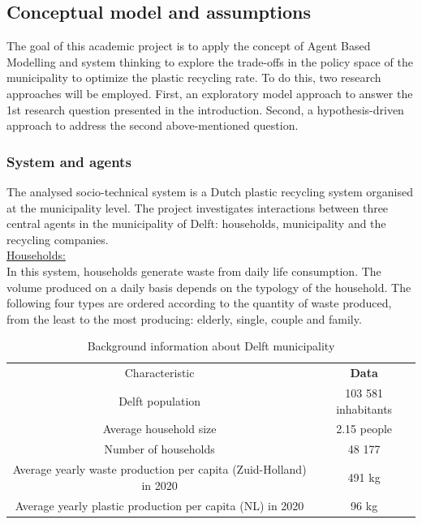 \subsection{Conceptual model and assumptions}
\noindent The goal of this academic project is to apply the concept of Agent Based Modelling and system thinking to explore the trade-offs in the policy space of the municipality to optimize the plastic recycling rate. To do this, two research approaches will be employed. First, an exploratory model approach to answer the 1st research question presented in the introduction. Second, a hypothesis-driven approach to address the second above-mentioned question. 

\subsubsection{System and agents}
\noindent The analysed socio-technical system is a Dutch plastic recycling system organised at the municipality level. The project investigates interactions between three central agents in the municipality of Delft: households, municipality and the recycling companies. \\

\underline{Households:}\\
\noindent In this system, households generate waste from daily life consumption. The volume produced on a daily basis depends on the typology of the household. The following four types are ordered according to the quantity of waste produced, from the least to the most producing: elderly, single, couple and family. \\

\begin{table}[h]
\centering
\caption{Background information about Delft municipality}
\begin{tabular}{cc}
\rowcolor[HTML]{666666} 
{\color[HTML]{FFFFFF} Characteristic}                             & {\color[HTML]{FFFFFF} \textbf{Data}} \\
Delft population                                                  & 103 581 inhabitants                  \\
Average household size                                            & 2.15 people                          \\
Number of households                                              & 48 177                               \\
Average yearly waste production per capita (Zuid-Holland) in 2020 & 491 kg                               \\
Average yearly plastic production per capita (NL) in 2020         & 96 kg                               
\end{tabular}
\end{table}\\

